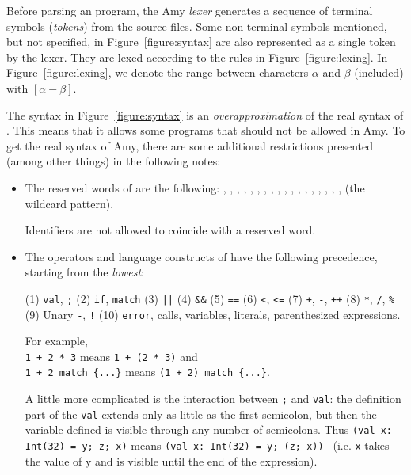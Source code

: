 Before parsing an \langname program, the Amy \emph{lexer} generates a sequence of terminal symbols
(\emph{tokens}) from the source files. 
Some non-terminal symbols mentioned, but not specified, in Figure~\ref{figure:syntax}
are also represented as a single token by the lexer.
They are lexed according to the rules in Figure~\ref{figure:lexing}.
In Figure~\ref{figure:lexing}, we denote the range between characters $\alpha$ and $\beta$ (included)
with $[\alpha - \beta]$.

The syntax in Figure~\ref{figure:syntax} is an \emph{overapproximation} of the real syntax of \langname.
This means that it allows some programs that should not be allowed in Amy.
To get the real syntax of Amy, there are some additional restrictions presented (among other things)
in the following notes:

\begin{itemize}
    \item The reserved words of \langname are the following: 
        , , , , ,
        , , , , , , ,
        ,
        ,
        , , , , \gtns{\_} (the wildcard pattern).

        Identifiers are not allowed to coincide with a reserved word.
    \item The operators and language constructs of \langname 
        have the following precedence, starting from the \emph{lowest}:
    
        (1) \lstinline{val}, \lstinline{;}
        (2) \lstinline{if}, \lstinline{match} (3) \lstinline{||}
        (4) \lstinline{&&} (5) \lstinline{==}
        (6) \lstinline{<}, \lstinline{<=} (7) \lstinline{+}, \lstinline{-}, \lstinline{++}
        (8) \lstinline{*}, \lstinline{/}, \lstinline{%}
        (9) Unary \lstinline{-}, \lstinline{!}
        (10) \lstinline{error}, calls, variables, literals, parenthesized expressions.

        For example,\\
        \lstinline{1 + 2 * 3} means \lstinline{1 + (2 * 3)} and \\
        \lstinline|1 + 2 match {...}| means \lstinline|(1 + 2) match {...}|.

        A little more complicated is the interaction between \lstinline{;} and \lstinline{val}:
        the definition part of the \lstinline{val} extends only as little as the first semicolon,
        but then the variable defined is visible through any number of semicolons.
        Thus
        \lstinline{(val x: Int(32) = y; z; x)} means \lstinline{(val x: Int(32) = y; (z; x)) }
        (i.e. \lstinline{x} takes the value of y and is visible until the end of the expression).


\end{itemize}
